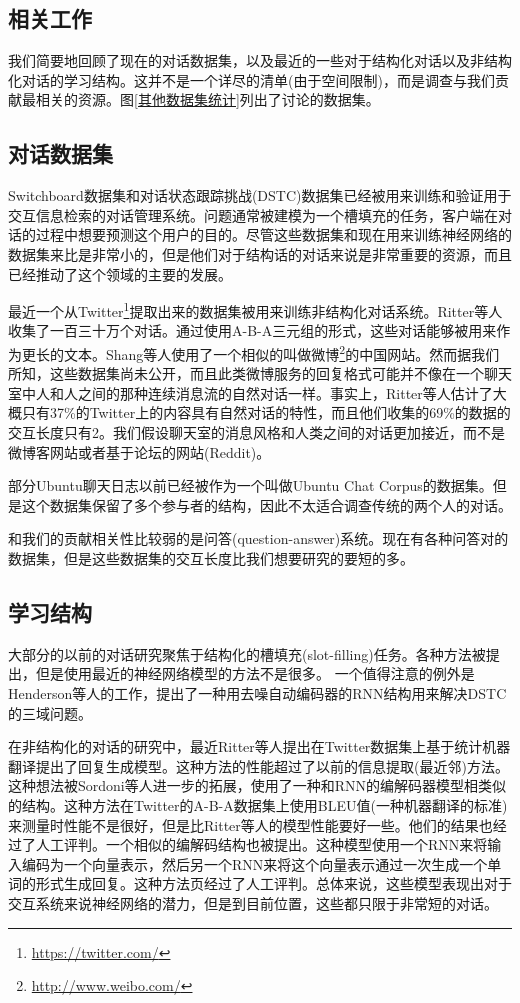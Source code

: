 \documentclass{article}
\begin{document}
\begin{multicols}{2}
	\section{相关工作}
		我们简要地回顾了现在的对话数据集，以及最近的一些对于结构化对话以及非结构化对话的学习结构。这并不是一个详尽的清单(由于空间限制)，而是调查与我们贡献最相关的资源。图\ref{其他数据集统计}列出了讨论的数据集。
		
				
		\subsection{对话数据集}
		Switchboard数据集和对话状态跟踪挑战(DSTC)数据集已经被用来训练和验证用于交互信息检索的对话管理系统。问题通常被建模为一个槽填充的任务，客户端在对话的过程中想要预测这个用户的目的。尽管这些数据集和现在用来训练神经网络的数据集来比是非常小的，但是他们对于结构话的对话来说是非常重要的资源，而且已经推动了这个领域的主要的发展。
		
		最近一个从Twitter\footnote{\href{https://twitter.com/}{https://twitter.com/}}提取出来的数据集被用来训练非结构化对话系统。Ritter等人收集了一百三十万个对话。通过使用A-B-A三元组的形式，这些对话能够被用来作为更长的文本。Shang等人使用了一个相似的叫做微博\footnote{\href{http://www.weibo.com/}{http://www.weibo.com/}}的中国网站。然而据我们所知，这些数据集尚未公开，而且此类微博服务的回复格式可能并不像在一个聊天室中人和人之间的那种连续消息流的自然对话一样。事实上，Ritter等人估计了大概只有37\%的Twitter上的内容具有自然对话的特性，而且他们收集的69\%的数据的交互长度只有2。我们假设聊天室的消息风格和人类之间的对话更加接近，而不是微博客网站或者基于论坛的网站(Reddit)。
		
		部分Ubuntu聊天日志以前已经被作为一个叫做Ubuntu Chat Corpus的数据集。但是这个数据集保留了多个参与者的结构，因此不太适合调查传统的两个人的对话。
		
		和我们的贡献相关性比较弱的是问答(question-answer)系统。现在有各种问答对的数据集，但是这些数据集的交互长度比我们想要研究的要短的多。
		
		\subsection{学习结构}
		
		大部分的以前的对话研究聚焦于结构化的槽填充(slot-filling)任务。各种方法被提出，但是使用最近的神经网络模型的方法不是很多。	一个值得注意的例外是Henderson等人的工作，提出了一种用去噪自动编码器的RNN结构用来解决DSTC的三域问题。
		
		在非结构化的对话的研究中，最近Ritter等人提出在Twitter数据集上基于统计机器翻译提出了回复生成模型。这种方法的性能超过了以前的信息提取(最近邻)方法。这种想法被Sordoni等人进一步的拓展，使用了一种和RNN的编解码器模型相类似的结构。这种方法在Twitter的A-B-A数据集上使用BLEU值(一种机器翻译的标准)来测量时性能不是很好，但是比Ritter等人的模型性能要好一些。他们的结果也经过了人工评判。一个相似的编解码结构也被提出。这种模型使用一个RNN来将输入编码为一个向量表示，然后另一个RNN来将这个向量表示通过一次生成一个单词的形式生成回复。这种方法页经过了人工评判。总体来说，这些模型表现出对于交互系统来说神经网络的潜力，但是到目前位置，这些都只限于非常短的对话。
		

\end{multicols}
\end{document}
